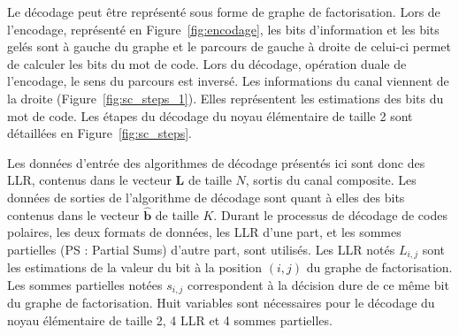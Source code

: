 
Le décodage peut être représenté sous forme de graphe de factorisation. Lors de l'encodage, représenté en Figure~\ref{fig:encodage}, les bits d'information et les bits gelés sont à gauche du graphe et le parcours de gauche à droite de celui-ci permet de calculer les bits du mot de code. Lors du décodage, opération duale de l'encodage, le sens du parcours est inversé. Les informations du canal viennent de la droite (Figure~\ref{fig:sc_steps_1}). Elles représentent les estimations des bits du mot de code. 
Les étapes du décodage du noyau élémentaire de taille 2 sont détaillées en Figure~\ref{fig:sc_steps}.

Les données d'entrée des algorithmes de décodage présentés ici sont donc des LLR, contenus dans le vecteur $\mathbold{L}$ de taille $N$, sortis du canal composite. Les données de sorties de l'algorithme de décodage sont quant à elles des bits contenus dans le vecteur $\mathbold{\hat{b}}$ de taille $K$.
Durant le processus de décodage de codes polaires, les deux formats de données,  les LLR d'une part, et les sommes partielles (PS : Partial Sums) d'autre part, sont utilisés. 
Les LLR notés $L_{i,j}$ sont les estimations de la valeur du bit à la position $(i,j)$ du graphe de factorisation. Les sommes partielles notées $s_{i,j}$ correspondent à la décision dure de ce même bit du graphe de factorisation.
Huit variables sont nécessaires pour le décodage du noyau élémentaire de taille 2, 4 LLR et 4 sommes partielles.

